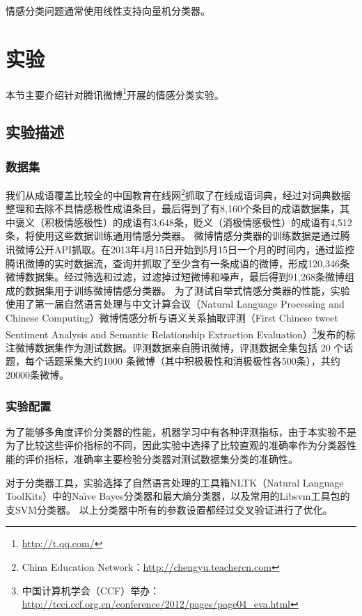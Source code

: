 情感分类问题通常使用线性支持向量机分类器。

\section{实验}
\label{experiment}
本节主要介绍针对腾讯微博\footnote{\url{http://t.qq.com/}}开展的情感分类实验。

\subsection{实验描述}
\label{description}

\subsubsection{数据集}
我们从成语覆盖比较全的中国教育在线网\footnote{China Education Network：\url{http://chengyu.teachercn.com}}抓取了在线成语词典，经过对词典数据整理和去除不具情感极性成语条目，最后得到了有8,160个条目的成语数据集，其中褒义（积极情感极性）的成语有3,648条，贬义（消极情感极性）的成语有4,512条，将使用这些数据训练通用情感分类器。
微博情感分类器的训练数据是通过腾讯微博公开API抓取。在2013年4月15日开始到5月15日一个月的时间内，通过监控腾讯微博的实时数据流，查询并抓取了至少含有一条成语的微博，形成120,346条微博数据集。经过筛选和过滤，过滤掉过短微博和噪声，最后得到91,268条微博组成的数据集用于训练微博情感分类器。
为了测试自举式情感分类器的性能，实验使用了第一届自然语言处理与中文计算会议（Natural Language Processing and Chinese Computing）微博情感分析与语义关系抽取评测（First Chinese tweet Sentiment Analysis and Semantic Relationship Extraction Evaluation）\footnote{中国计算机学会（CCF）举办：\url{http://tcci.ccf.org.cn/conference/2012/pages/page04_eva.html}}发布的标注微博数据集作为测试数据。评测数据来自腾讯微博，评测数据全集包括 20 个话题，每个话题采集大约1000
条微博（其中积极极性和消极极性各500条），共约20000条微博。
 
\subsubsection{实验配置}
为了能够多角度评价分类器的性能，机器学习中有各种评测指标，由于本实验不是为了比较这些评价指标的不同，因此实验中选择了比较直观的准确率作为分类器性能的评价指标，准确率主要检验分类器对测试数据集分类的准确性。

对于分类器工具，实验选择了自然语言处理的工具箱NLTK（Natural Language ToolKits）中的Na\"\i ve Bayes分类器和最大熵分类器，以及常用的Libsvm工具包的支SVM分类器。
以上分类器中所有的参数设置都经过交叉验证进行了优化。

